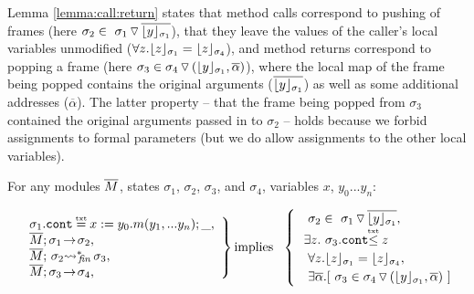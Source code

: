 Lemma \ref{lemma:call:return}
states that method calls  correspond  to pushing of frames (here $\sigma_2 \in \PushS  {\interpret {\sigma_1} {y}} {\sigma_1}$),
 that they leave the values of the caller's local variables unmodified ($\forall z. \interpret {\sigma_1} {z} = \interpret {\sigma_4} {z}$), and
method returns  correspond  to popping  a frame  (here $\sigma_3 \in  \PushSLong  {( {\interpret {\sigma_1} {y}},{\overline \alpha})} {\sigma_4}$), where the local map of the frame being popped contains the original arguments ($\overline {{\interpret {\sigma_1} {y}}}$) as well as some additional addresses ($\overline \alpha$).
The latter property -- that  the frame being popped from $\sigma_3$ contained the original arguments passed in to $\sigma_2$ -- holds because 
 we forbid assignments to formal parameters (but we do allow  assignments to the other local variables).
 
 
 \begin{lemma}
 \label{lemma:call:return}
 For any modules $\Mtwo$, states $\sigma_1$, $\sigma_2$, $\sigma_3$, and $\sigma_4$, variables $x$, $y_0... y_n$:
 
 $  
   \left. %
   \begin{array}{l}  \ \strut \ \ \sigma_1.\prg{cont}\txteq x:= y_0.m(y_1,...y_n);\_ ,\\
    \ \strut \ \  \leadstoOrig {\Mtwo} {\sigma_1}   {\sigma_2} , \\
     \ \strut \ \  \leadstoBoundedStarFin  {\Mtwo}  {\sigma_2}  {\sigma_3}, \\
  \ \strut \ \  \leadstoOrig {\Mtwo} {\sigma_3}   {\sigma_4}, 
    \end{array} 
\right \}
 \mbox{implies} \ \ 
  \begin{cases}
     \ \strut \ \  \sigma_2 \in \PushS  {\interpret {\sigma_1} {y}} {\sigma_1},\\
     \ \strut \  \exists z.\ \sigma_3.\prg{cont}{\txtin z} \\
       \ \strut \ \       \forall z. \interpret {\sigma_1} {z} = \interpret {\sigma_4} {z},\\  
        \ \strut \ \       \exists \overline \alpha. [\ \sigma_3 \in  \PushSLong  {( {\interpret {\sigma_1} {y}},{\overline \alpha})} {\sigma_4} \ ]
    \end{cases} 
$
 \end{lemma}
 
